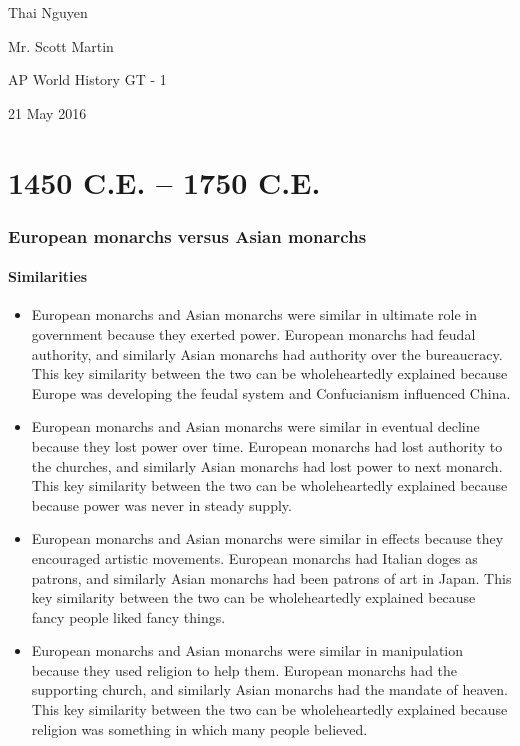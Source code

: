 \documentclass[letterpaper, 10pt]{article}
\begin{document}
    \setcounter{secnumdepth}{-1}

    Thai Nguyen

    Mr. Scott Martin

    AP World History GT - 1

    21 May 2016

    \footnotesize
    \part{1450 C.E. -- 1750 C.E.}
        \section{European monarchs versus Asian monarchs}
            \subsection{Similarities}
                \begin{itemize}
                    \item European monarchs and Asian monarchs were similar in ultimate role in government because they exerted power. European monarchs had feudal authority, and similarly Asian monarchs had authority over the bureaucracy. This key similarity between the two can be wholeheartedly explained because Europe was developing the feudal system and Confucianism influenced China.
                    \item European monarchs and Asian monarchs were similar in eventual decline because they lost power over time. European monarchs had lost authority to the churches, and similarly Asian monarchs had lost power to next monarch. This key similarity between the two can be wholeheartedly explained because because power was never in steady supply.
                    \item European monarchs and Asian monarchs were similar in effects because they encouraged artistic movements. European monarchs had Italian doges as patrons, and similarly Asian monarchs had been patrons of art in Japan. This key similarity between the two can be wholeheartedly explained because fancy people liked fancy things.
                    \item European monarchs and Asian monarchs were similar in manipulation because they used religion to help them. European monarchs had the supporting church, and similarly Asian monarchs had the mandate of heaven. This key similarity between the two can be wholeheartedly explained because religion was something in which many people believed.
                \end{itemize}
\end{document}
